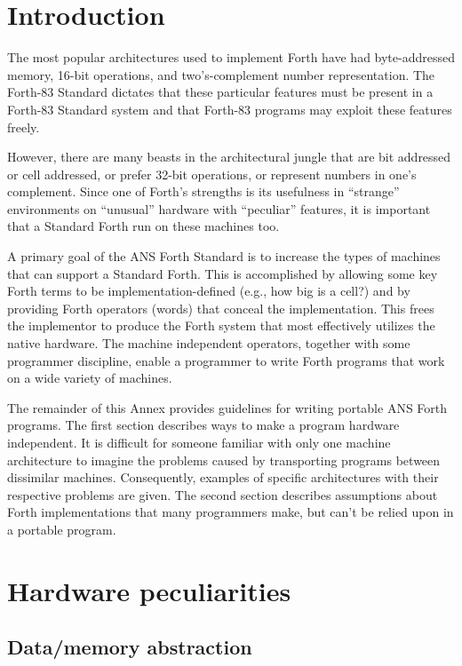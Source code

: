 \label{annex:port}

\section{Introduction} %

The most popular architectures used to implement Forth have had
byte-addressed memory, 16-bit operations, and two's-complement
number representation. The Forth-83 Standard dictates that these
particular features must be present in a Forth-83 Standard system
and that Forth-83 programs may exploit these features freely.

However, there are many beasts in the architectural jungle that are
bit addressed or cell addressed, or prefer 32-bit operations, or
represent numbers in one's complement. Since one of Forth's strengths
is its usefulness in ``strange'' environments on ``unusual'' hardware
with ``peculiar'' features, it is important that a Standard Forth run
on these machines too.

A primary goal of the ANS Forth Standard is to increase the types of
machines that can support a Standard Forth. This is accomplished by
allowing some key Forth terms to be implementation-defined (e.g., how
big is a cell?) and by providing Forth operators (words) that conceal
the implementation. This frees the implementor to produce the Forth
system that most effectively utilizes the native hardware. The machine
independent operators, together with some programmer discipline, enable
a programmer to write Forth programs that work on a wide variety of
machines.

The remainder of this Annex provides guidelines for writing portable
ANS Forth programs. The first section describes ways to make a program
hardware independent. It is difficult for someone familiar with only
one machine architecture to imagine the problems caused by transporting
programs between dissimilar machines. Consequently, examples of specific
architectures with their respective problems are given. The second
section describes assumptions about Forth implementations that many
programmers make, but can't be relied upon in a portable program.

\section{Hardware peculiarities} %
\label{port:hardware}

\subsection{Data/memory abstraction} %

